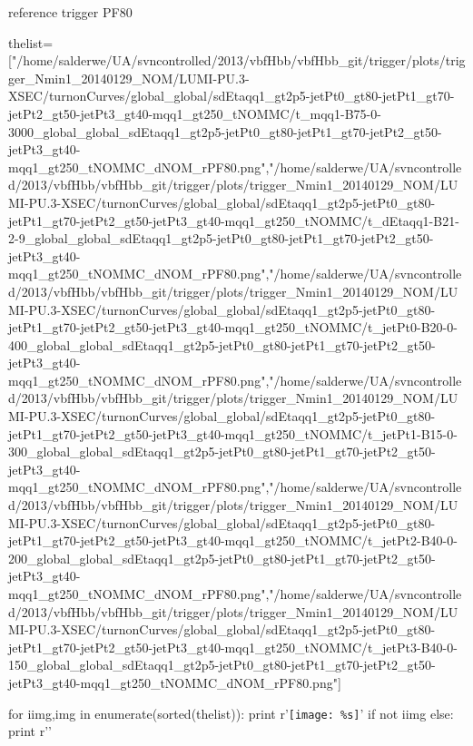 \documentclass[12pt,english,dvipsnames]{beamer}
\begin{document}
\begin{frame}[t,fragile]{reference trigger PF80}
\begin{python}
thelist=["/home/salderwe/UA/svncontrolled/2013/vbfHbb/vbfHbb_git/trigger/plots/trigger_Nmin1_20140129_NOM/LUMI-PU.3-XSEC/turnonCurves/global_global/sdEtaqq1_gt2p5-jetPt0_gt80-jetPt1_gt70-jetPt2_gt50-jetPt3_gt40-mqq1_gt250_tNOMMC/t_mqq1-B75-0-3000_global_global_sdEtaqq1_gt2p5-jetPt0_gt80-jetPt1_gt70-jetPt2_gt50-jetPt3_gt40-mqq1_gt250_tNOMMC_dNOM_rPF80.png","/home/salderwe/UA/svncontrolled/2013/vbfHbb/vbfHbb_git/trigger/plots/trigger_Nmin1_20140129_NOM/LUMI-PU.3-XSEC/turnonCurves/global_global/sdEtaqq1_gt2p5-jetPt0_gt80-jetPt1_gt70-jetPt2_gt50-jetPt3_gt40-mqq1_gt250_tNOMMC/t_dEtaqq1-B21-2-9_global_global_sdEtaqq1_gt2p5-jetPt0_gt80-jetPt1_gt70-jetPt2_gt50-jetPt3_gt40-mqq1_gt250_tNOMMC_dNOM_rPF80.png","/home/salderwe/UA/svncontrolled/2013/vbfHbb/vbfHbb_git/trigger/plots/trigger_Nmin1_20140129_NOM/LUMI-PU.3-XSEC/turnonCurves/global_global/sdEtaqq1_gt2p5-jetPt0_gt80-jetPt1_gt70-jetPt2_gt50-jetPt3_gt40-mqq1_gt250_tNOMMC/t_jetPt0-B20-0-400_global_global_sdEtaqq1_gt2p5-jetPt0_gt80-jetPt1_gt70-jetPt2_gt50-jetPt3_gt40-mqq1_gt250_tNOMMC_dNOM_rPF80.png","/home/salderwe/UA/svncontrolled/2013/vbfHbb/vbfHbb_git/trigger/plots/trigger_Nmin1_20140129_NOM/LUMI-PU.3-XSEC/turnonCurves/global_global/sdEtaqq1_gt2p5-jetPt0_gt80-jetPt1_gt70-jetPt2_gt50-jetPt3_gt40-mqq1_gt250_tNOMMC/t_jetPt1-B15-0-300_global_global_sdEtaqq1_gt2p5-jetPt0_gt80-jetPt1_gt70-jetPt2_gt50-jetPt3_gt40-mqq1_gt250_tNOMMC_dNOM_rPF80.png","/home/salderwe/UA/svncontrolled/2013/vbfHbb/vbfHbb_git/trigger/plots/trigger_Nmin1_20140129_NOM/LUMI-PU.3-XSEC/turnonCurves/global_global/sdEtaqq1_gt2p5-jetPt0_gt80-jetPt1_gt70-jetPt2_gt50-jetPt3_gt40-mqq1_gt250_tNOMMC/t_jetPt2-B40-0-200_global_global_sdEtaqq1_gt2p5-jetPt0_gt80-jetPt1_gt70-jetPt2_gt50-jetPt3_gt40-mqq1_gt250_tNOMMC_dNOM_rPF80.png","/home/salderwe/UA/svncontrolled/2013/vbfHbb/vbfHbb_git/trigger/plots/trigger_Nmin1_20140129_NOM/LUMI-PU.3-XSEC/turnonCurves/global_global/sdEtaqq1_gt2p5-jetPt0_gt80-jetPt1_gt70-jetPt2_gt50-jetPt3_gt40-mqq1_gt250_tNOMMC/t_jetPt3-B40-0-150_global_global_sdEtaqq1_gt2p5-jetPt0_gt80-jetPt1_gt70-jetPt2_gt50-jetPt3_gt40-mqq1_gt250_tNOMMC_dNOM_rPF80.png"]

for iimg,img in enumerate(sorted(thelist)):
  print r'\texttt{[image: \%s]}'%
  if not iimg%
  else: print r'\newline'

\end{python}
\end{frame}
\end{document}
